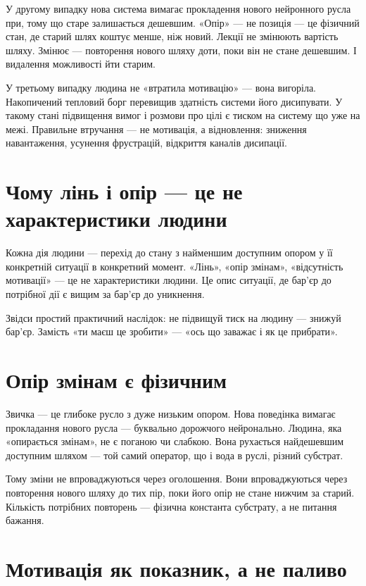 \documentclass[12pt, a4paper, openany]{book}
\begin{document}
У другому випадку нова система вимагає прокладення нового нейронного русла при, тому що старе залишається дешевшим. «Опір» — не позиція — це фізичний стан, де старий шлях коштує менше, ніж новий. Лекції не змінюють вартість шляху. Змінює — повторення нового шляху доти, поки він не стане дешевшим. І видалення можливості йти старим.

У третьому випадку людина не «втратила мотивацію» — вона вигоріла. Накопичений тепловий борг перевищив здатність системи його дисипувати. У такому стані підвищення вимог і розмови про цілі є тиском на систему що уже на межі. Правильне втручання — не мотивація, а відновлення: зниження навантаження, усунення фрустрацій, відкриття каналів дисипації.

\section{Чому лінь і опір --- це не характеристики людини}

Кожна дія людини — перехід до стану з найменшим доступним опором у її конкретній ситуації в конкретний момент. «Лінь», «опір змінам», «відсутність мотивації» — це не характеристики людини. Це опис ситуації, де бар'єр до потрібної дії є вищим за бар'єр до уникнення.

Звідси простий практичний наслідок: не підвищуй тиск на людину --- знижуй бар'єр. Замість «ти маєш це зробити» --- «ось що заважає і як це прибрати».

\section{Опір змінам є фізичним}

Звичка --- це глибоке русло з дуже низьким опором. Нова поведінка вимагає прокладання нового русла --- буквально дорожчого нейронально. Людина, яка «опирається змінам», не є поганою чи слабкою. Вона рухається найдешевшим доступним шляхом --- той самий оператор, що і вода в руслі, різний субстрат.

Тому зміни не впроваджуються через оголошення. Вони впроваджуються через повторення нового шляху до тих пір, поки його опір не стане нижчим за старий. Кількість потрібних повторень --- фізична константа субстрату, а не питання бажання.

\section{Мотивація як показник, а не паливо}
\end{document}
